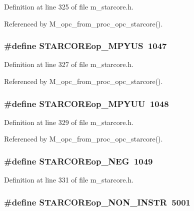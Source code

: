 Definition at line 325 of file m\_\-starcore.h.

Referenced by M\_\-opc\_\-from\_\-proc\_\-opc\_\-starcore().
\subsubsection{\setlength{\rightskip}{0pt plus 5cm}\#define STARCOREop\_\-MPYUS~1047}\label{m__starcore_8h_daf840f88e65732bdfb8cc0c6d4fcd15}




Definition at line 327 of file m\_\-starcore.h.

Referenced by M\_\-opc\_\-from\_\-proc\_\-opc\_\-starcore().
\subsubsection{\setlength{\rightskip}{0pt plus 5cm}\#define STARCOREop\_\-MPYUU~1048}\label{m__starcore_8h_9c659f8b7d4fc5afa2f34605f0590383}




Definition at line 329 of file m\_\-starcore.h.

Referenced by M\_\-opc\_\-from\_\-proc\_\-opc\_\-starcore().
\subsubsection{\setlength{\rightskip}{0pt plus 5cm}\#define STARCOREop\_\-NEG~1049}\label{m__starcore_8h_1374638e72e93b3d54fa622fb6fc5280}




Definition at line 331 of file m\_\-starcore.h.
\subsubsection{\setlength{\rightskip}{0pt plus 5cm}\#define STARCOREop\_\-NON\_\-INSTR~5001}\label{m__starcore_8h_14bb9f385d0d0f607f592ec705ccd0d3}




